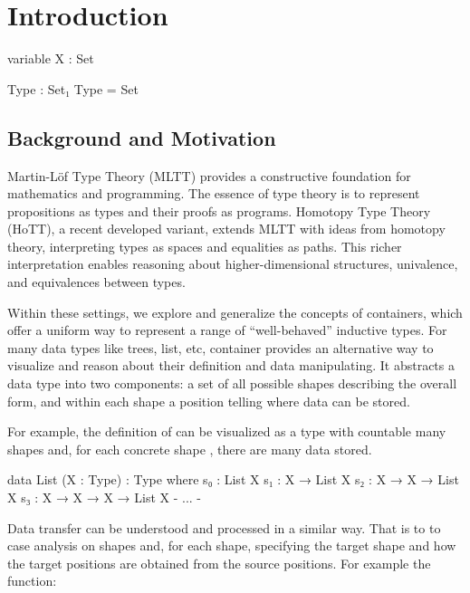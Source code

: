 \chapter{Introduction}

\begin{code}[hide]
variable X : Set

Type : Set₁
Type = Set
\end{code}

\section{Background and Motivation}

Martin-Löf Type Theory (MLTT) provides a constructive foundation for mathematics and programming. The essence of type theory is to represent propositions as types and their proofs as programs. Homotopy Type Theory (HoTT), a recent developed variant, extends MLTT with ideas from homotopy theory, interpreting types as spaces and equalities as paths. This richer interpretation enables reasoning about higher-dimensional structures, univalence, and equivalences between types.

Within these settings, we explore and generalize the concepts of containers, which offer a uniform way to represent a range of ``well-behaved'' inductive types. For many data types like trees, list, etc, container provides an alternative way to visualize and reason about their definition and data manipulating. It abstracts a data type into two components: a set of all possible shapes describing the overall form, and within each shape a position telling where data can be stored.

For example, the definition of   can be visualized as a type with countable many shapes  and, for each concrete shape  \AgdaSymbol{:} , there are  many data  stored.

\begin{code}
data List (X : Type) : Type where
  s₀ : List X
  s₁ : X → List X
  s₂ : X → X → List X
  s₃ : X → X → X → List X
  {- ... -}
\end{code}

Data transfer can be understood and processed in a similar way. That is to to case analysis on shapes and, for each shape, specifying the target shape and how the target positions are obtained from the source positions. For example the  function:

